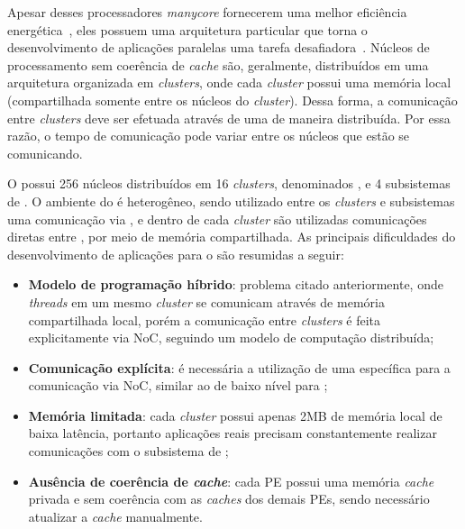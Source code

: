 Apesar desses processadores \textit{manycore} fornecerem uma melhor eficiência
energética~\cite{Castro-IA3-JPDC:2014}, eles possuem uma arquitetura particular
que torna o desenvolvimento de aplicações paralelas uma tarefa
desafiadora~\cite{Varghese14,Castro-PARCO:2016,Castro-SBAC-PAD:2014}. Núcleos de
processamento sem coerência de \textit{cache} são, geralmente, distribuídos em
uma arquitetura organizada em \textit{clusters}, onde cada \textit{cluster}
possui uma memória local (compartilhada somente entre os núcleos do
\textit{cluster}). Dessa forma, a comunicação entre \textit{clusters} deve ser efetuada através de uma \noc de maneira distribuída.
Por essa razão, o tempo de comunicação pode variar entre os núcleos que estão se
comunicando.

O \mppa possui 256 núcleos distribuídos em 16 \textit{clusters}, denominados
\pes, e 4 subsistemas de \es. O ambiente do \mppa é heterogêneo, sendo utilizado
entre os \textit{clusters} e subsistemas uma comunicação via \noc, e
dentro de cada \textit{cluster} são utilizadas comunicações diretas entre
\pes, por meio de memória compartilhada. As principais dificuldades do
desenvolvimento de aplicações para o \mppa são resumidas a seguir:

\begin{itemize}
	\item \textbf{Modelo de programação híbrido}: problema citado anteriormente, onde \textit{threads}
em um mesmo \textit{cluster} se comunicam através de memória compartilhada
local, porém a comunicação entre \textit{clusters} é feita explicitamente via
NoC, seguindo um modelo de computação distribuída;
	\item \textbf{Comunicação explícita}: é necessária a utilização de uma \api
específica para a comunicação via NoC, similar ao \posix de baixo nível para
\ipc;
	\item \textbf{Memória limitada}: cada \textit{cluster} possui apenas 2MB de memória
local de baixa latência, portanto aplicações reais precisam constantemente
realizar comunicações com o subsistema de \es;
	\item \textbf{Ausência de coerência de \textit{cache}}: cada PE possui uma memória \textit{cache} privada e sem coerência
com as \textit{caches} dos demais PEs, sendo necessário atualizar a \textit{cache} manualmente.
\end{itemize}

